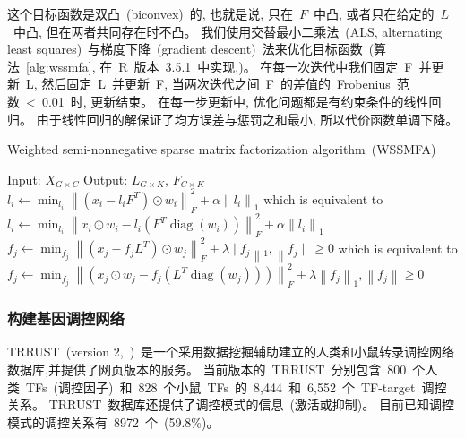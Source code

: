 这个目标函数是双凸~(biconvex)~的, 也就是说, 只在~$F$~中凸, 或者只在给定的~$L$~中凸, 但在两者共同存在时不凸。
我们使用交替最小二乘法~(ALS, alternating least squares)~与梯度下降~(gradient descent)~法来优化目标函数~(算法~\ref{alg:wssmfa}, 在~R~版本~3.5.1~中实现,\cite{goeman2012penalized,goeman2010l1})。
在每一次迭代中我们固定~F~并更新~L, 然后固定~L~并更新~F, 当两次迭代之间~F~的差值的~Frobenius~范数~<~0.01~时, 更新结束。
在每一步更新中, 优化问题都是有约束条件的线性回归。
由于线性回归的解保证了均方误差与惩罚之和最小, 所以代价函数单调下降。
\begin{algorithm}
    \caption{Weighted semi-nonnegative sparse matrix factorization algorithm~(WSSMFA)}
    \label{alg:wssmfa}
    \begin{algorithmic}[1]
        \State Input: $X_{G \times C}$                                   
        \State Output: $L_{G \times K}$, $F_{C \times K}$                
                                                          
                \State $l_{i} \leftarrow \min _{l_{i}}\left\|\left(x_{i}-l_{i} F^{T}\right) \odot w_{i}\right\|_{F}^{2}+\alpha\left\|l_{i}\right\|_{1}$ 
                \State which is equivalent to 
                \State $l_{i} \leftarrow \min _{l_{i}}\left\|x_{i} \odot w_{i}-l_{i}\left(F^{T} \operatorname{diag}\left(w_{i}\right)\right)\right\|_{F}^{2}+\alpha\left\|l_{i}\right\|_{1}$
            \EndFor
                \State $f_{j} \leftarrow \min _{f_{j}}\left\|\left(x_{j}-f_{j} L^{T}\right) \odot w_{j}\right\|_{F}^{2}+\lambda \mid f_{j}\left\|_{1},\right\| f_{j} \| \geq 0$
                \State which is equivalent to 
                \State $f_{j} \leftarrow \min _{f_{j}}\left\|\left(x_{j} \odot w_{j}-f_{j}\left(L^{T} \operatorname{diag}\left(w_{j}\right)\right)\right)\right\|_{F}^{2}+\lambda\left\|f_{j}\right\|_{1},\left\|f_{j}\right\| \geq 0$
            \EndFor
        \EndWhile           
  \end{algorithmic}
\end{algorithm}

\subsubsection{构建基因调控网络}
TRRUST~(version 2,~\cite{han2018trrust})~是一个采用数据挖掘辅助建立的人类和小鼠转录调控网络数据库,并提供了网页版本的服务。
当前版本的~TRRUST~分别包含~800~个人类~TFs~(调控因子)~和~828~个小鼠~TFs~的~8,444~和~6,552~个~TF-target~调控关系。
TRRUST~数据库还提供了调控模式的信息~(激活或抑制)。
目前已知调控模式的调控关系有~8972~个~(59.8\%)。

